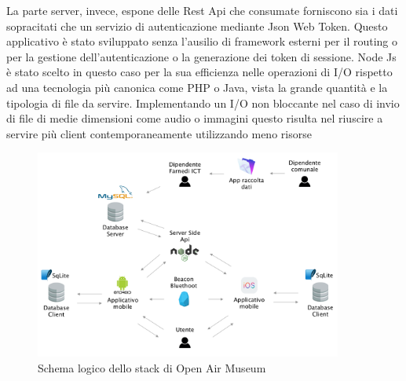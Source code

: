 La parte server, invece, espone delle Rest Api che consumate forniscono sia i dati sopracitati che un servizio di autenticazione mediante Json Web Token. Questo applicativo è stato sviluppato senza l’ausilio di framework esterni per il routing o per la gestione dell’autenticazione o la generazione dei token di sessione. Node Js è stato scelto in questo caso per la sua efficienza nelle operazioni di I/O rispetto ad una tecnologia più canonica come PHP o Java, vista la grande quantità e la tipologia di file da servire. Implementando un I/O non bloccante nel caso di invio di file di medie dimensioni come audio o immagini questo risulta nel riuscire a servire più client contemporaneamente utilizzando meno risorse \cite{BlockingVsNonBlocking} \vspace{5mm}

\begin{figure}[h]
\centering
\includegraphics[width=0.9\textwidth]{images/SchemaOpenAirMuseum.png}
\caption{Schema logico dello stack di Open Air Museum}
\end{figure}







